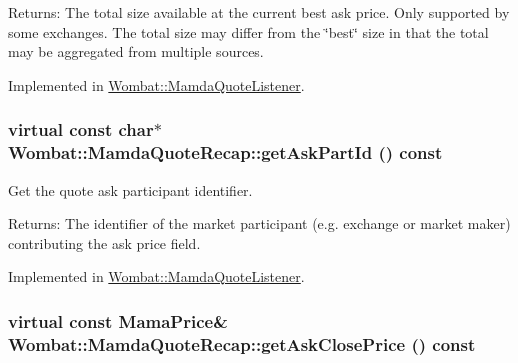 \begin{Desc}
\item[Returns:]The total size available at the current best ask price. Only supported by some exchanges. The total size may differ from the \char`\"{}best\char`\"{} size in that the total may be aggregated from multiple sources. \end{Desc}


Implemented in \hyperlink{classWombat_1_1MamdaQuoteListener_4bc38582299115bc9d45411e4fabc76d}{Wombat::Mamda\-Quote\-Listener}.\hypertarget{classWombat_1_1MamdaQuoteRecap_aac45c1c6970f8b6a4a7b318d36bda7d}{
\subsubsection[getAskPartId]{\setlength{\rightskip}{0pt plus 5cm}virtual const char$\ast$ Wombat::Mamda\-Quote\-Recap::get\-Ask\-Part\-Id () const}}
\label{classWombat_1_1MamdaQuoteRecap_aac45c1c6970f8b6a4a7b318d36bda7d}


Get the quote ask participant identifier. 

\begin{Desc}
\item[Returns:]The identifier of the market participant (e.g. exchange or market maker) contributing the ask price field. \end{Desc}


Implemented in \hyperlink{classWombat_1_1MamdaQuoteListener_b8a1c5463eb9ebf89fc402c32e2c81c7}{Wombat::Mamda\-Quote\-Listener}.\hypertarget{classWombat_1_1MamdaQuoteRecap_903eb978e89cd7b89363c03a7e86f726}{
\subsubsection[getAskClosePrice]{\setlength{\rightskip}{0pt plus 5cm}virtual const Mama\-Price\& Wombat::Mamda\-Quote\-Recap::get\-Ask\-Close\-Price () const}}
\label{classWombat_1_1MamdaQuoteRecap_903eb978e89cd7b89363c03a7e86f726}


